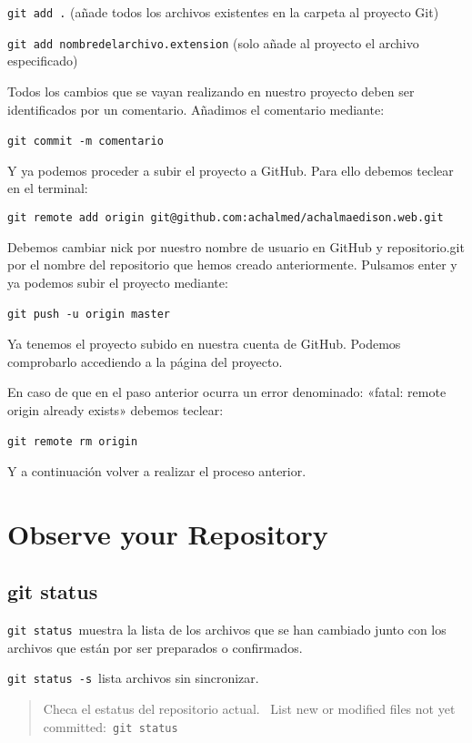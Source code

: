 \documentclass[
  a2paper,
]{article}
\begin{document}
\texttt{git\ add\ .} (añade todos los archivos existentes en la carpeta
al proyecto Git)~~

\texttt{git\ add\ nombredelarchivo.extension} (solo añade al proyecto el
archivo especificado)~~

Todos los cambios que se vayan realizando en nuestro proyecto deben ser
identificados por un comentario. Añadimos el comentario mediante:

\texttt{git\ commit\ -m\ \textquotesingle{}comentario\textquotesingle{}}~~

Y ya podemos proceder a subir el proyecto a GitHub. Para ello debemos
teclear en el terminal:

\texttt{git\ remote\ add\ origin~git@github.com:achalmed/achalmaedison.web.git}

Debemos cambiar nick por nuestro nombre de usuario en GitHub y
repositorio.git por el nombre del repositorio que hemos creado
anteriormente. Pulsamos enter y ya podemos subir el proyecto mediante:

\texttt{git\ push\ -u\ origin~master}~~

Ya tenemos el proyecto subido en nuestra cuenta de GitHub. Podemos
comprobarlo accediendo a la página del proyecto.

En caso de que en el paso anterior ocurra un error denominado: «fatal:
remote origin already exists» debemos teclear:

\texttt{git\ remote\ rm\ origin}~~

Y a continuación volver a realizar el proceso anterior.

\hypertarget{observe-your-repository}{%
\section{Observe your Repository}\label{observe-your-repository}}

\hypertarget{git-status}{%
\subsection{git status}\label{git-status}}

\texttt{git\ status}~muestra la lista de los archivos que se han
cambiado junto con los archivos que están por ser preparados o
confirmados.

\texttt{git\ status\ -s}~lista archivos sin sincronizar.

\begin{quote}
Checa el estatus del repositorio actual.~ List new or modified files not
yet committed:~\texttt{git\ status}
\end{quote}
\end{document}
